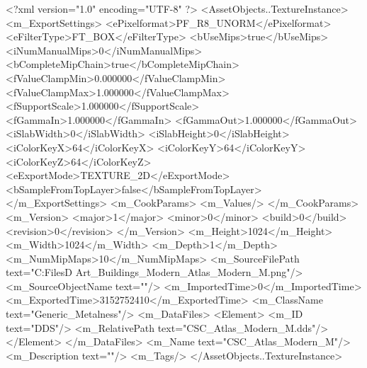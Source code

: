 <?xml version="1.0" encoding="UTF-8" ?>
<AssetObjects..TextureInstance>
	<m_ExportSettings>
		<ePixelformat>PF_R8_UNORM</ePixelformat>
		<eFilterType>FT_BOX</eFilterType>
		<bUseMips>true</bUseMips>
		<iNumManualMips>0</iNumManualMips>
		<bCompleteMipChain>true</bCompleteMipChain>
		<fValueClampMin>0.000000</fValueClampMin>
		<fValueClampMax>1.000000</fValueClampMax>
		<fSupportScale>1.000000</fSupportScale>
		<fGammaIn>1.000000</fGammaIn>
		<fGammaOut>1.000000</fGammaOut>
		<iSlabWidth>0</iSlabWidth>
		<iSlabHeight>0</iSlabHeight>
		<iColorKeyX>64</iColorKeyX>
		<iColorKeyY>64</iColorKeyY>
		<iColorKeyZ>64</iColorKeyZ>
		<eExportMode>TEXTURE_2D</eExportMode>
		<bSampleFromTopLayer>false</bSampleFromTopLayer>
	</m_ExportSettings>
	<m_CookParams>
		<m_Values/>
	</m_CookParams>
	<m_Version>
		<major>1</major>
		<minor>0</minor>
		<build>0</build>
		<revision>0</revision>
	</m_Version>
	<m_Height>1024</m_Height>
	<m_Width>1024</m_Width>
	<m_Depth>1</m_Depth>
	<m_NumMipMaps>10</m_NumMipMaps>
	<m_SourceFilePath text="C:\Users\Shadow\Desktop\Working Files\3D Art\Textures\CSC_Buildings_Modern\Current\textures\CSC_Atlas_Modern_M.png"/>
	<m_SourceObjectName text=""/>
	<m_ImportedTime>0</m_ImportedTime>
	<m_ExportedTime>3152752410</m_ExportedTime>
	<m_ClassName text="Generic_Metalness"/>
	<m_DataFiles>
		<Element>
			<m_ID text="DDS"/>
			<m_RelativePath text="CSC_Atlas_Modern_M.dds"/>
		</Element>
	</m_DataFiles>
	<m_Name text="CSC_Atlas_Modern_M"/>
	<m_Description text=""/>
	<m_Tags/>
</AssetObjects..TextureInstance>

